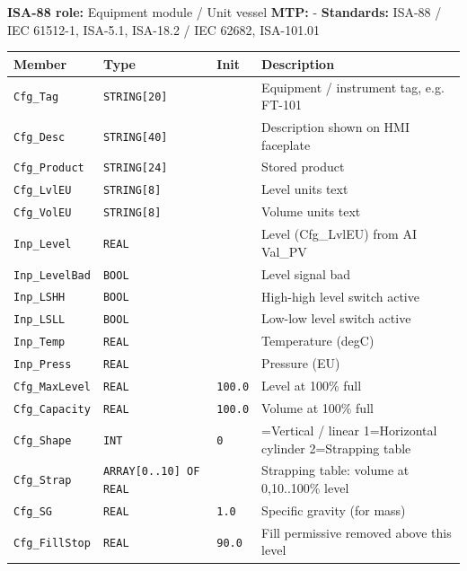 {\small\textbf{ISA-88 role:} Equipment module /\allowbreak{} Unit vessel \quad \textbf{MTP:} - \quad \textbf{Standards:} ISA-88 /\allowbreak{} IEC 61512-1, ISA-5.1, ISA-18.2 /\allowbreak{} IEC 62682, ISA-101.01}
{\footnotesize
\begin{longtable}{@{}>{\raggedright\arraybackslash}p{3.4cm}>{\raggedright\arraybackslash}p{3.3cm}>{\raggedright\arraybackslash}p{1.3cm}>{\raggedright\arraybackslash}p{6.4cm}@{}}
\toprule
\rowcolor{tblhead}\textbf{Member} & \textbf{Type} & \textbf{Init} & \textbf{Description} \\
\midrule
\endhead
\texttt{Cfg\_Tag} & \texttt{STRING[20]} &  & Equipment /\allowbreak{} instrument tag, e.g. FT-101 \\
\texttt{Cfg\_Desc} & \texttt{STRING[40]} &  & Description shown on HMI faceplate \\
\texttt{Cfg\_Product} & \texttt{STRING[24]} &  & Stored product \\
\texttt{Cfg\_LvlEU} & \texttt{STRING[8]} &  & Level units text \\
\texttt{Cfg\_VolEU} & \texttt{STRING[8]} &  & Volume units text \\
\texttt{Inp\_Level} & \texttt{REAL} &  & Level (Cfg\_LvlEU) from AI Val\_PV \\
\texttt{Inp\_LevelBad} & \texttt{BOOL} &  & Level signal bad \\
\texttt{Inp\_LSHH} & \texttt{BOOL} &  & High-high level switch active \\
\texttt{Inp\_LSLL} & \texttt{BOOL} &  & Low-low level switch active \\
\texttt{Inp\_Temp} & \texttt{REAL} &  & Temperature (degC) \\
\texttt{Inp\_Press} & \texttt{REAL} &  & Pressure (EU) \\
\texttt{Cfg\_MaxLevel} & \texttt{REAL} & \texttt{100.0} & Level at 100\% full \\
\texttt{Cfg\_Capacity} & \texttt{REAL} & \texttt{100.0} & Volume at 100\% full \\
\texttt{Cfg\_Shape} & \texttt{INT} & \texttt{0} & 0=Vertical /\allowbreak{} linear 1=Horizontal cylinder 2=Strapping table \\
\texttt{Cfg\_Strap} & \texttt{ARRAY[0..10] OF REAL} &  & Strapping table: volume at 0,10..100\% level \\
\texttt{Cfg\_SG} & \texttt{REAL} & \texttt{1.0} & Specific gravity (for mass) \\
\texttt{Cfg\_FillStop} & \texttt{REAL} & \texttt{90.0} & Fill permissive removed above this level \\

\end{longtable}}

